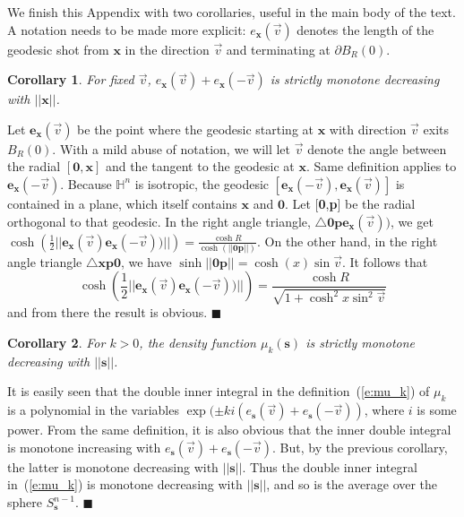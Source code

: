 \documentclass{article}
\newcommand{\s}{{\mathbf s}}
\newcommand{\x}{{\mathbf x}}
\newcommand{\e}{\mathbf{e}}
\newtheorem{corollary}{Corollary}
\newenvironment{proof}
{\noindent {\bf Proof.}}
{$\blacksquare$}
\begin{document}
We finish this Appendix with two corollaries, useful in the main body of the text. 
A notation needs to be made more explicit: $e_\x(\vec{v})$ denotes the length of the geodesic 
shot from $\x$ in the direction $\vec{v}$ and terminating at $\partial B_R(0)$. 
\begin{corollary}
For fixed $\vec{v}$, 
$e_\x(\vec{v})+e_\x(-\vec{v})$ is strictly monotone decreasing with $||\x||$. 
\end{corollary}
\begin{proof}
Let $\e_\x(\vec{v})$ be the point where the geodesic starting at $\x$ with direction $\vec{v}$ exits $B_R(0)$. 
With a mild abuse of notation, we will let $\vec{v}$ denote the angle between the radial $[\textbf{0},\x]$  
and the tangent to the geodesic at $\x$. Same definition applies to $\e_\x(-\vec{v})$. 
Because $\mathbb{H}^n$ is isotropic, 
the geodesic $[\e_\x(-\vec{v}),\e_\x(\vec{v})]$ is contained in a plane, 
which itself contains $\x$ and $\textbf{0}$. 
Let [\textbf{0},\textbf{p}] be the radial orthogonal to that geodesic. 
In the right angle triangle, $\triangle \textbf{0}\textbf{p}\e_\x(\vec{v}))$, 
we get 
$\cosh \left(\frac{1}{2}||\e_\x(\vec{v})\e_\x(-\vec{v}))||\right)=\frac{\cosh R}{\cosh (||\textbf{0}\textbf{p}||)}$. 
On the other hand, in the right angle triangle $\triangle \x\textbf{p}\textbf{0}$, 
we have $\sinh ||\textbf{0}\textbf{p}||=\cosh(x) \sin \vec{v}$. 
It follows that 
$$ \cosh\left(\frac{1}{2}||\e_\x(\vec{v})\e_\x(-\vec{v}))||\right)=\frac{\cosh R}{\sqrt{1+\cosh^2x \sin^2 \vec{v}}}$$
and from there the result is obvious. 
\end{proof}

\begin{corollary}
For $k>0$, the density function $\mu_k(\s)$ is strictly monotone decreasing with $||\s||$.
\end{corollary}

\begin{proof}
It is easily seen that the double inner integral in the definition~(\ref{e:mu_k}) of $\mu_k$  
is a polynomial in the variables $\exp(\pm ki(e_\s(\vec{v})+e_\s(-\vec{v}))$, where $i$ is some power. 
From the same definition, it is also obvious that the inner double integral is monotone increasing with 
$e_\s(\vec{v})+e_\s(-\vec{v})$. But, by the previous corollary, the latter is monotone decreasing with $||\s||$. 
Thus the double inner integral in~(\ref{e:mu_k}) is monotone decreasing with $||\s||$, and so is the average 
over the sphere $S_\s^{n-1}$. 
\end{proof}
\end{document}
